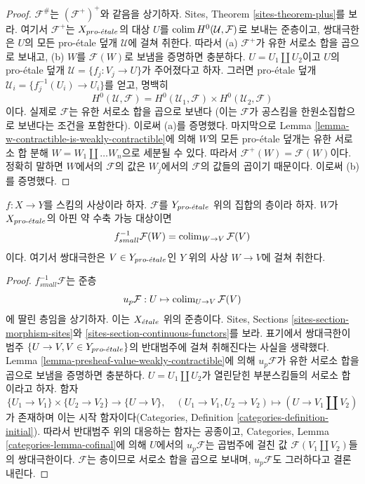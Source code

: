 \begin{proof}
$\mathcal{F}^\#$는 $(\mathcal{F}^+)^+$와 같음을 상기하자. Sites,
Theorem \ref{sites-theorem-plus}를 보라. 여기서 $\mathcal{F}^+$는
$X_{pro\text{-}\acute{e}tale}$의 대상 $U$를 $\mathop{\mathrm{colim}}\nolimits H^0(\mathcal{U}, \mathcal{F})$로
보내는 준층이고, 쌍대극한은 $U$의 모든 pro-\'etale 덮개
$\mathcal{U}$에 걸쳐 취한다. 따라서 (a) $\mathcal{F}^+$가 유한 서로소
합을 곱으로 보내고, (b) $W$를 $\mathcal{F}(W)$로 보냄을 증명하면
충분하다. $U = U_1 \amalg U_2$이고 $U$의 pro-\'etale 덮개
$\mathcal{U} = \{f_j : V_j \to U\}$가 주어졌다고 하자. 그러면
pro-\'etale 덮개
$\mathcal{U}_i = \{f_j^{-1}(U_i) \to U_i\}$를 얻고, 명백히
$$
H^0(\mathcal{U}, \mathcal{F}) =
H^0(\mathcal{U}_1, \mathcal{F}) \times
H^0(\mathcal{U}_2, \mathcal{F})
$$
이다. 실제로 $\mathcal{F}$는 유한 서로소 합을 곱으로 보낸다
(이는 $\mathcal{F}$가 공스킴을 한원소집합으로 보낸다는 조건을
포함한다). 이로써 (a)를 증명했다. 마지막으로 Lemma
\ref{lemma-w-contractible-is-weakly-contractible}에 의해 $W$의 모든
pro-\'etale 덮개는 유한 서로소 합 분해
$W = W_1 \amalg \ldots W_n$으로 세분될 수 있다. 따라서
$\mathcal{F}^+(W) = \mathcal{F}(W)$이다. 정확히 말하면 $W$에서의
$\mathcal{F}$의 값은 $W_j$에서의 $\mathcal{F}$의 값들의 곱이기
때문이다. 이로써 (b)를 증명했다.
\end{proof}

\begin{lemma}
\label{lemma-small-pullback-weakly-contractible}
$f : X \to Y$를 스킴의 사상이라 하자. $\mathcal{F}$를
$Y_{pro\text{-}\acute{e}tale}$ 위의 집합의 층이라 하자. $W$가 $X_{pro\text{-}\acute{e}tale}$의 아핀
약 수축 가능 대상이면
$$
f_{small}^{-1}\mathcal{F}(W) = \mathop{\mathrm{colim}}\nolimits_{W \to V} \mathcal{F}(V)
$$
이다. 여기서 쌍대극한은 $V \in Y_{pro\text{-}\acute{e}tale}$인 $Y$ 위의 사상
$W \to V$에 걸쳐 취한다.
\end{lemma}

\begin{proof}
$f_{small}^{-1}\mathcal{F}$는 준층
$$
u_p\mathcal{F} : U \mapsto \mathop{\mathrm{colim}}\nolimits_{U \to V} \mathcal{F}(V)
$$
에 딸린 층임을 상기하자.
이는 $X_{\acute{e}tale}$ 위의 준층이다. Sites, Sections
\ref{sites-section-morphism-sites}와
\ref{sites-section-continuous-functors}를 보라. 표기에서 쌍대극한이
범주 $\{U \to V, V \in Y_{pro\text{-}\acute{e}tale}\}$의 반대범주에 걸쳐 취해진다는
사실을 생략했다. Lemma \ref{lemma-presheaf-value-weakly-contractible}에
의해 $u_p\mathcal{F}$가 유한 서로소 합을 곱으로 보냄을 증명하면
충분하다.
$U = U_1 \amalg U_2$가 열린닫힌 부분스킴들의 서로소 합이라고 하자.
함자
$$
\{U_1 \to V_1\} \times \{U_2 \to V_2\} \longrightarrow
\{U \to V\},\quad
(U_1 \to V_1, U_2 \to V_2) \longmapsto (U \to V_1 \amalg V_2)
$$
가 존재하며 이는 시작 함자이다(Categories, Definition
\ref{categories-definition-initial}). 따라서 반대범주 위의 대응하는
함자는 공종이고, Categories, Lemma \ref{categories-lemma-cofinal}에
의해 $U$에서의 $u_p\mathcal{F}$는 곱범주에 걸친 값
$\mathcal{F}(V_1 \amalg V_2)$들의 쌍대극한이다.
$\mathcal{F}$는 층이므로 서로소 합을 곱으로 보내며,
$u_p\mathcal{F}$도 그러하다고 결론내린다.
\end{proof}

